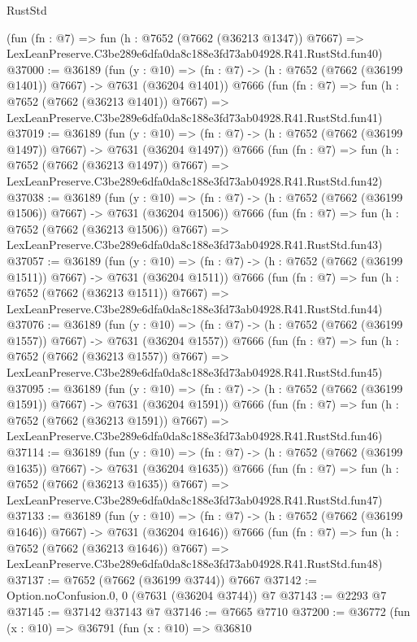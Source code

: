 \begin{lexlean}{RustStd}
\begin{coremodule}
    (fun (fn : @7) =>
    fun (h : @7652 (@7662 (@36213 @1347)) @7667) =>
    LexLeanPreserve.C3be289e6dfa0da8c188e3fd73ab04928.R41.RustStd.fun40)
@37000 := @36189
    (fun (y : @10) => (fn : @7) -> (h : @7652 (@7662 (@36199 @1401)) @7667) -> @7631 (@36204 @1401))
    @7666
    (fun (fn : @7) =>
    fun (h : @7652 (@7662 (@36213 @1401)) @7667) =>
    LexLeanPreserve.C3be289e6dfa0da8c188e3fd73ab04928.R41.RustStd.fun41)
@37019 := @36189
    (fun (y : @10) => (fn : @7) -> (h : @7652 (@7662 (@36199 @1497)) @7667) -> @7631 (@36204 @1497))
    @7666
    (fun (fn : @7) =>
    fun (h : @7652 (@7662 (@36213 @1497)) @7667) =>
    LexLeanPreserve.C3be289e6dfa0da8c188e3fd73ab04928.R41.RustStd.fun42)
@37038 := @36189
    (fun (y : @10) => (fn : @7) -> (h : @7652 (@7662 (@36199 @1506)) @7667) -> @7631 (@36204 @1506))
    @7666
    (fun (fn : @7) =>
    fun (h : @7652 (@7662 (@36213 @1506)) @7667) =>
    LexLeanPreserve.C3be289e6dfa0da8c188e3fd73ab04928.R41.RustStd.fun43)
@37057 := @36189
    (fun (y : @10) => (fn : @7) -> (h : @7652 (@7662 (@36199 @1511)) @7667) -> @7631 (@36204 @1511))
    @7666
    (fun (fn : @7) =>
    fun (h : @7652 (@7662 (@36213 @1511)) @7667) =>
    LexLeanPreserve.C3be289e6dfa0da8c188e3fd73ab04928.R41.RustStd.fun44)
@37076 := @36189
    (fun (y : @10) => (fn : @7) -> (h : @7652 (@7662 (@36199 @1557)) @7667) -> @7631 (@36204 @1557))
    @7666
    (fun (fn : @7) =>
    fun (h : @7652 (@7662 (@36213 @1557)) @7667) =>
    LexLeanPreserve.C3be289e6dfa0da8c188e3fd73ab04928.R41.RustStd.fun45)
@37095 := @36189
    (fun (y : @10) => (fn : @7) -> (h : @7652 (@7662 (@36199 @1591)) @7667) -> @7631 (@36204 @1591))
    @7666
    (fun (fn : @7) =>
    fun (h : @7652 (@7662 (@36213 @1591)) @7667) =>
    LexLeanPreserve.C3be289e6dfa0da8c188e3fd73ab04928.R41.RustStd.fun46)
@37114 := @36189
    (fun (y : @10) => (fn : @7) -> (h : @7652 (@7662 (@36199 @1635)) @7667) -> @7631 (@36204 @1635))
    @7666
    (fun (fn : @7) =>
    fun (h : @7652 (@7662 (@36213 @1635)) @7667) =>
    LexLeanPreserve.C3be289e6dfa0da8c188e3fd73ab04928.R41.RustStd.fun47)
@37133 := @36189
    (fun (y : @10) => (fn : @7) -> (h : @7652 (@7662 (@36199 @1646)) @7667) -> @7631 (@36204 @1646))
    @7666
    (fun (fn : @7) =>
    fun (h : @7652 (@7662 (@36213 @1646)) @7667) =>
    LexLeanPreserve.C3be289e6dfa0da8c188e3fd73ab04928.R41.RustStd.fun48)
@37137 := @7652 (@7662 (@36199 @3744)) @7667
@37142 := Option.noConfusion.{0, 0} (@7631 (@36204 @3744)) @7
@37143 := @2293 @7
@37145 := @37142 @37143 @7
@37146 := @7665 @7710
@37200 := @36772
    (fun (x : @10) =>
    @36791
      (fun (x : @10) =>
      @36810

\end{coremodule}
\end{lexlean}
